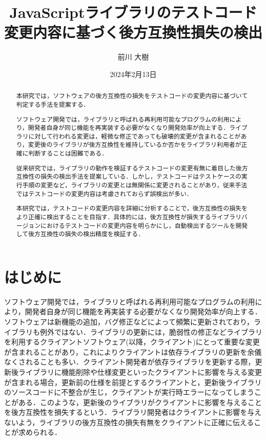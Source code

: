 \documentclass[11pt,dvipdfmx]{jreport}
\title{JavaScriptライブラリのテストコード変更内容に基づく後方互換性損失の検出}
\author{前川 大樹}
\date{2024年2月13日}	%
\begin{document}
\maketitle

\begin{abstract}
本研究では，ソフトウェアの後方互換性の損失をテストコードの変更内容に基づいて判定する手法を提案する．

ソフトウェア開発では，ライブラリと呼ばれる再利用可能なプログラムの利用により，開発者自身が同じ機能を再実装する必要がなくなり開発効率が向上する．ライブラリに対して行われる変更は，軽微な修正であっても破壊的変更が含まれることがあり，変更後のライブラリが後方互換性を維持しているか否かをライブラリ利用者が正確に判断することは困難である．

従来研究では，ライブラリの動作を検証するテストコードの変更有無に着目した後方互換性の損失の検出手法を提案している．しかし，テストコードはテストケースの実行手順の変更など，ライブラリの変更とは無関係に変更されることがあり，従来手法ではテストコードの変更内容は考慮されておらず誤検出が多い．

本研究では，テストコードの変更内容を詳細に分析することで，後方互換性の損失をより正確に検出することを目指す．具体的には，後方互換性が損失するライブラリバージョンにおけるテストコードの変更内容を明らかにし，自動検出するツールを開発して後方互換性の損失の検出精度を検証する．

\end{abstract}

\tableofcontents



\newpage
{}	%



\chapter{はじめに}
ソフトウェア開発では，ライブラリと呼ばれる再利用可能なプログラムの利用により，開発者自身が同じ機能を再実装する必要がなくなり開発効率が向上する\cite{shared-software}\cite{effect-on-developer}．ソフトウェアは新機能の追加，バグ修正などによって頻繁に更新されており，ライブラリも例外ではない\cite{library-analysis}．ライブラリの更新には，脆弱性の修正などライブラリを利用するクライアントソフトウェア(以降，クライアント)にとって重要な変更が含まれることがあり，これによりクライアントは依存ライブラリの更新を余儀なくされることも多い．クライアント開発者が依存ライブラリを更新する際，更新後ライブラリに機能削除や仕様変更といったクライアントに影響を与える変更が含まれる場合，更新前の仕様を前提とするクライアントと，更新後ライブラリのソースコードに不整合が生じ，クライアントが実行時エラーになってしまうことがある．このような，更新後のライブラリがクライアントに影響を与えることを後方互換性を損失するという．ライブラリ開発者はクライアントに影響を与えないよう，ライブラリの後方互換性の損失有無をクライアントに正確に伝えることが求められる．
\end{document}

